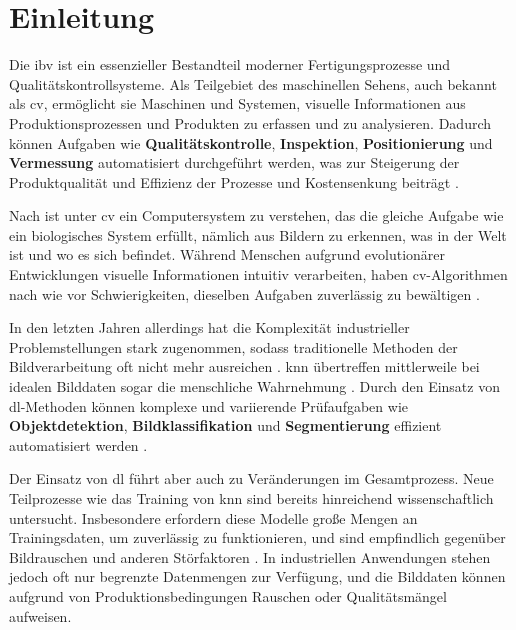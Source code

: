 \chapter{Einleitung}\label{sec:Einleitung}
\pagestyle{headings} %

Die \gls{ibv} ist ein essenzieller Bestandteil moderner Fertigungsprozesse und Qualitätskontrollsysteme. Als Teilgebiet des maschinellen Sehens, auch bekannt als \gls{cv}, ermöglicht sie Maschinen und Systemen, visuelle Informationen aus Produktionsprozessen und Produkten zu erfassen und zu analysieren. Dadurch können Aufgaben wie \textbf{Qualitätskontrolle}, \textbf{Inspektion}, \textbf{Positionierung} und \textbf{Vermessung} automatisiert durchgeführt werden, was zur Steigerung der Produktqualität und Effizienz der Prozesse und Kostensenkung beiträgt \citep{cognex_grundlagen_nodate}.

Nach \citep{jahne_digitale_2024} ist unter \gls{cv} ein Computersystem zu verstehen, das die gleiche Aufgabe wie ein biologisches System erfüllt, nämlich aus Bildern zu erkennen, was in der Welt ist und wo es sich befindet. Während Menschen aufgrund evolutionärer Entwicklungen visuelle Informationen intuitiv verarbeiten, haben \gls{cv}-Algorithmen nach wie vor Schwierigkeiten, dieselben Aufgaben zuverlässig zu bewältigen \citep[S.~3]{szeliski_computer_2022}. 

In den letzten Jahren allerdings hat die Komplexität industrieller Problemstellungen stark zugenommen, sodass traditionelle Methoden der Bildverarbeitung oft nicht mehr ausreichen \citep[S.~442]{suse_bildverarbeitung_2014}. \gls{knn} übertreffen mittlerweile bei idealen Bilddaten sogar die menschliche Wahrnehmung \citep{dodge_study_2017}. Durch den Einsatz von \gls{dl}-Methoden können komplexe und variierende Prüfaufgaben wie \textbf{Objektdetektion}, \textbf{Bildklassifikation} und \textbf{Segmentierung} effizient automatisiert werden \citep{kaur_systematic_2024, manakitsa_review_2024}.

Der Einsatz von \gls{dl} führt aber auch zu Veränderungen im Gesamtprozess. Neue Teilprozesse wie das Training von \gls{knn} sind bereits hinreichend wissenschaftlich untersucht. Insbesondere erfordern diese Modelle große Mengen an Trainingsdaten, um zuverlässig zu funktionieren, und sind empfindlich gegenüber Bildrauschen und anderen Störfaktoren \citep{dodge_study_2017}. In industriellen Anwendungen stehen jedoch oft nur begrenzte Datenmengen zur Verfügung, und die Bilddaten können aufgrund von Produktionsbedingungen Rauschen oder Qualitätsmängel aufweisen.

